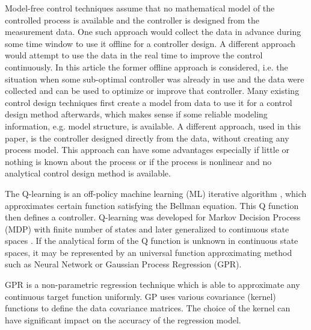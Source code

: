 \documentclass{ifacconf}
\begin{document}
Model-free control techniques assume that no mathematical model of
the controlled process is available and the controller is designed
from the measurement data. One such approach would collect the data
in advance during some time window to use it offline for a controller
design. A different approach would attempt to use the data in the
real time to improve the control continuously. In this article the
former offline approach is considered, i.e. the situation when some
sub-optimal controller was already in use and the data were collected
and can be used to optimize or improve that controller. Many existing
control design techniques first create a model from data to use it
for a control design method afterwards, which makes sense if some
reliable modeling information, e.g. model structure, is available.
A different approach, used in this paper, is the controller designed
directly from the data, without creating any process model. This approach can
have some advantages especially if little or nothing is known about
the process or if the process is nonlinear and no analytical control
design method is available.

The Q-learning is an off-policy machine learning (ML) iterative algorithm
\citep{ecc19ref:Sutton_Reinforcement_Learning}, which approximates
certain function satisfying the Bellman equation. This Q function
then defines a controller. Q-learning was developed for Markov Decision
Process (MDP) with finite number of states and later generalized to
continuous state spaces \citep{ecc19ref:Hasselt_Reinforcement_learning_in_continuous_action_spaces,ecc19ref:Gaskett_Q_Learning_IC}.
If the analytical form of the Q function is unknown in continuous
state spaces, it may be represented by an universal function approximating
method such as Neural Network or Gaussian Process Regression (GPR).

GPR is a non-parametric regression technique \citep{ecc19ref:Rasmussen_Gaussian_Processes}
which is able to approximate any continuous target function uniformly.
GP uses various covariance (kernel) functions \citep{ecc19ref:Williams_Prediction_with_Gaussian_processes}
to define the data covariance matrices. The choice of the kernel can
have significant impact on the accuracy of the regression model.
\end{document}
